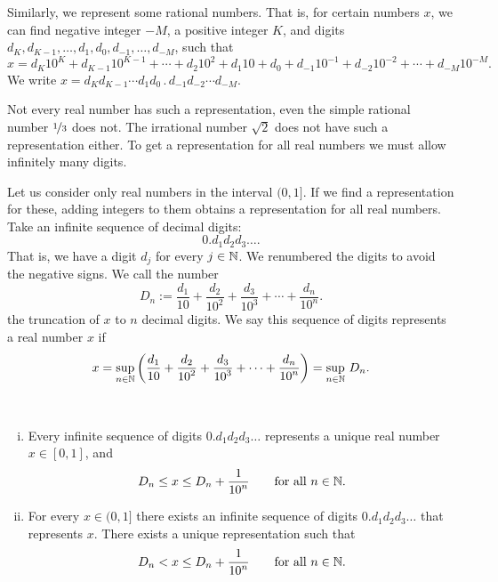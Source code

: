 Similarly, we
represent some rational numbers.  That is, for certain
numbers $x$, we can find
negative integer $-M$, a positive integer $K$, and digits
$d_K,d_{K-1},\ldots,d_1,d_0,d_{-1},\ldots,d_{-M}$, such that
\begin{equation*}
x = d_K {10}^K + d_{K-1} {10}^{K-1} + \cdots + d_2 {10}^2 + d_1 10 + d_0 
+ d_{-1} {10}^{-1} + d_{-2} {10}^{-2} + \cdots + d_{-M} {10}^{-M} .
\end{equation*}
We write $x = d_K d_{K-1} \cdots d_1 d_0 \, . \, d_{-1} d_{-2} \cdots d_{-M}$.

Not every real number has such a representation, even the simple
rational number $\nicefrac{1}{3}$ does not.  The irrational number $\sqrt{2}$ 
does not have such a representation either.  To get a representation for
all real numbers we must allow infinitely many digits.

Let us consider only real numbers in the interval $(0,1]$.  If
we find a representation for these, adding 
integers to them obtains a representation for all real numbers.
Take an infinite sequence of decimal digits:
\begin{equation*}
0.d_1d_2d_3\ldots.
\end{equation*}
That is, we have a digit $d_j$ for every $j \in {\mathbb{N}}$.
We renumbered the digits to avoid the negative signs.
We call the number
\begin{equation*}
D_n := 
\frac{d_1}{10} + 
\frac{d_2}{{10}^2} + 
\frac{d_3}{{10}^3} + 
\cdots +
\frac{d_n}{{10}^n} .
\end{equation*}
the truncation of $x$ to $n$ decimal digits.
We say this
sequence of digits represents a real number $x$ if
\begin{equation*}
x =
\sup_{n \in {\mathbb{N}}} \left(
\frac{d_1}{10} + 
\frac{d_2}{{10}^2} + 
\frac{d_3}{{10}^3} + 
\cdots +
\frac{d_n}{{10}^n}
\right) =
\sup_{n \in {\mathbb{N}}} \, D_n .
\end{equation*}

\begin{prop} \label{prop:decimalprop}
{~}
\begin{enumerate}[(i)]
\item
Every infinite sequence of digits
$0.d_1d_2d_3\ldots$ represents a unique real number $x \in [0,1]$, and
\begin{equation*}
D_n \leq x \leq D_n+\frac{1}{{10}^n} \qquad \text{for all $n \in {\mathbb{N}}$}.
\end{equation*}
\item
For every $x \in (0,1]$ there exists an infinite sequence of digits
$0.d_1d_2d_3\ldots$ that represents $x$.
There exists a unique representation such that
\begin{equation*}
D_n < x \leq D_n+\frac{1}{{10}^n} \qquad \text{for all $n \in {\mathbb{N}}$}.
\end{equation*}
\end{enumerate}
\end{prop}

